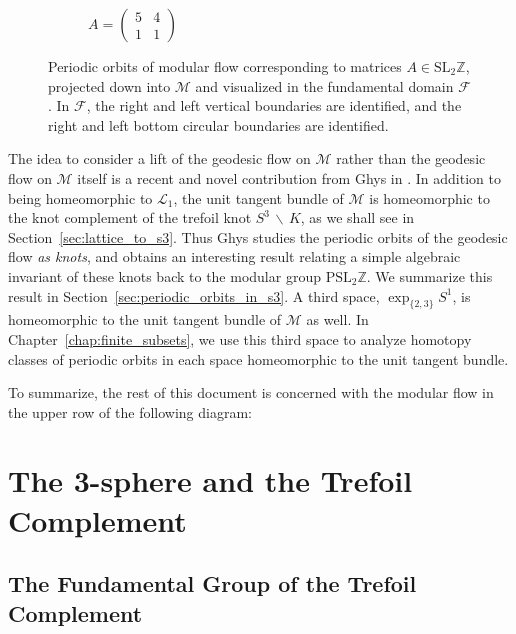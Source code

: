 \documentclass[12pt,twoside]{reedthesis}
\theoremstyle{definition}
\newcommand{\Z}{\mathbb{Z}}
\newcommand{\LS}{\mathcal{L}}
\newcommand{\SLZ}{\mathrm{SL}_2{\Z}}
\newcommand{\PSLZ}{\mathrm{PSL}_2{\Z}}
\newcommand{\wo}{\, \backslash \,}
\begin{document}
\begin{figure}[t]
\begin{subfigure}[t]{0.4\textwidth}
    \caption*{$A = \begin{pmatrix}5 & 4 \\ 1 & 1\end{pmatrix}$}
  \end{subfigure}
  \caption{Periodic orbits of modular flow corresponding to matrices $A \in \SLZ$, projected down into $\mathcal{M}$ and visualized in the fundamental domain $\mathcal{F}$. In $\mathcal{F}$, the right and left vertical boundaries are identified, and the right and left bottom circular boundaries are identified.}
  \label{fig:modular_surface_orbits}
\end{figure}

The idea to consider a lift of the geodesic flow on $\mathcal{M}$ rather than the geodesic flow on $\mathcal{M}$ itself is a recent and novel contribution from Ghys in \cite{ghys2007}.
In addition to being homeomorphic to $\LS_1$, the unit tangent bundle of $\mathcal{M}$ is homeomorphic to the knot complement of the trefoil knot $S^3 \wo K$, as we shall see in Section~\ref{sec:lattice_to_s3}.
Thus Ghys studies the periodic orbits of the geodesic flow \emph{as knots}, and obtains an interesting result relating a simple algebraic invariant of these knots back to the modular group $\PSLZ$.
We summarize this result in Section~\ref{sec:periodic_orbits_in_s3}.
A third space, $\exp_{\{2,3\}} S^1$, is homeomorphic to the unit tangent bundle of $\mathcal{M}$ as well.
In Chapter~\ref{chap:finite_subsets}, we use this third space to analyze homotopy classes of periodic orbits in each space homeomorphic to the unit tangent bundle.

To summarize, the rest of this document is concerned with the modular flow in the upper row of the following diagram:

\begin{center}
\end{center}

\chapter{The 3-sphere and the Trefoil Complement}\label{sec:three_sphere}

\section{The Fundamental Group of the Trefoil Complement}
\end{document}
